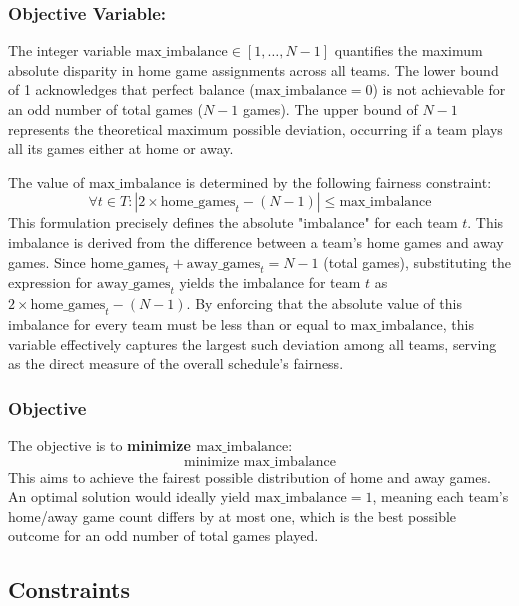\subsubsection{Objective Variable: }\label{objective}
The integer variable $\text{max\_imbalance} \in [1, \dots, N-1]$ quantifies the maximum absolute disparity in home game assignments across all teams. The lower bound of 1 acknowledges that perfect balance ($\text{max\_imbalance}=0$) is not achievable for an odd number of total games ($N-1$ games). The upper bound of $N-1$ represents the theoretical maximum possible deviation, occurring if a team plays all its games either at home or away.

The value of $\text{max\_imbalance}$ is determined by the following fairness constraint:
\[ \forall t \in T : \left| 2 \times \text{home\_games}_{t} - (N-1) \right| \leq \text{max\_imbalance} \]
This formulation precisely defines the absolute "imbalance" for each team $t$. This imbalance is derived from the difference between a team's home games and away games. Since $\text{home\_games}_{t} + \text{away\_games}_{t} = N-1$ (total games), substituting the expression for $\text{away\_games}_{t}$ yields the imbalance for team $t$ as $2 \times \text{home\_games}_{t} - (N-1)$. By enforcing that the absolute value of this imbalance for every team must be less than or equal to $\text{max\_imbalance}$, this variable effectively captures the largest such deviation among all teams, serving as the direct measure of the overall schedule's fairness.


\subsubsection{Objective}
The objective is to \textbf{minimize $\text{max\_imbalance}$}:
\[ \text{minimize } \text{max\_imbalance} \]
This aims to achieve the fairest possible distribution of home and away games. An optimal solution would ideally yield $\text{max\_imbalance}=1$, meaning each team's home/away game count differs by at most one, which is the best possible outcome for an odd number of total games played.


\subsection{Constraints}
